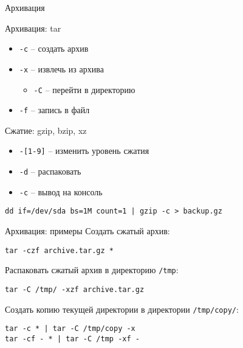 \begin{frame}[fragile]{Архивация}
	\begin{block}{Архивация: tar}
		\begin{itemize}
			\item {\tt -c} -- создать архив
			\item {\tt -x} -- извлечь из архива
				\begin{itemize}
					\item {\tt -C} -- перейти в директорию
				\end{itemize}
			\item {\tt -f} -- запись в файл
		\end{itemize}
	\end{block}

	\begin{block}{Сжатие: gzip, bzip, xz}
		\begin{itemize}
			\item {\tt -[1-9]} -- изменить уровень сжатия
			\item {\tt -d} -- распаковать
			\item {\tt -c} -- вывод на консоль
		\end{itemize}
		\begin{verbatim}
dd if=/dev/sda bs=1M count=1 | gzip -c > backup.gz
    \end{verbatim}
	\end{block}

\end{frame}

\begin{frame}[fragile]{Архивация: примеры}
	Создать сжатый архив:
	\begin{verbatim}
tar -czf archive.tar.gz *
        \end{verbatim}
	\pause
	Распаковать сжатый архив в директорию {\tt /tmp}:
	\begin{verbatim}
tar -C /tmp/ -xzf archive.tar.gz
        \end{verbatim}
	\pause
	Создать копию текущей директории в директории {\tt /tmp/copy/}:
	\begin{verbatim}
tar -c * | tar -C /tmp/copy -x
tar -cf - * | tar -C /tmp -xf -
        \end{verbatim}
\end{frame}
